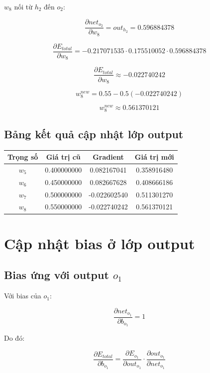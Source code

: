 $w_8$ nối từ $h_2$ đến $o_2$:

\[
    \frac{\partial net_{o_2}}{\partial w_8}
    =
    out_{h_2}
    =
    0.596884378
\]

\[
    \frac{\partial E_{total}}{\partial w_8}
    =
    -0.217071535
    \cdot
    0.175510052
    \cdot
    0.596884378
\]

\[
    \frac{\partial E_{total}}{\partial w_8}
    \approx -0.022740242
\]

\[
    w_8^{new}
    =
    0.55
    -
    0.5(-0.022740242)
\]

\[
    w_8^{new}
    \approx 0.561370121
\]

\subsection{Bảng kết quả cập nhật lớp output}

\begin{center}
\begin{tabular}{cccc}
\toprule
Trọng số & Giá trị cũ & Gradient & Giá trị mới \\
\midrule
$w_5$ & 0.400000000 & 0.082167041 & 0.358916480 \\
$w_6$ & 0.450000000 & 0.082667628 & 0.408666186 \\
$w_7$ & 0.500000000 & -0.022602540 & 0.511301270 \\
$w_8$ & 0.550000000 & -0.022740242 & 0.561370121 \\
\bottomrule
\end{tabular}
\end{center}

\section{Cập nhật bias ở lớp output}

\subsection{Bias ứng với output $o_1$}

Với bias của $o_1$:

\[
    \frac{\partial net_{o_1}}{\partial b_{o_1}}=1
\]

Do đó:

\[
    \frac{\partial E_{total}}{\partial b_{o_1}}
    =
    \frac{\partial E_{o_1}}{\partial out_{o_1}}
    \cdot
    \frac{\partial out_{o_1}}{\partial net_{o_1}}
\]

